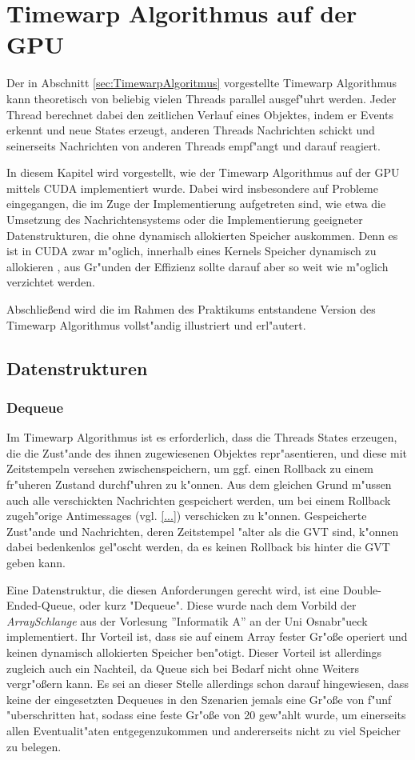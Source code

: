 \documentclass[a4paper, 10pt, openright, parskip, chapterprefix]{scrreprt}
\begin{document}
\chapter{Timewarp Algorithmus auf der GPU}
Der in Abschnitt \ref{sec:TimewarpAlgoritmus} vorgestellte Timewarp Algorithmus kann theoretisch von beliebig vielen Threads
parallel ausgef"uhrt werden. Jeder Thread berechnet dabei den zeitlichen Verlauf eines Objektes, indem er Events erkennt
und neue States erzeugt, anderen Threads Nachrichten schickt und seinerseits Nachrichten von anderen Threads empf"angt
und darauf reagiert. 

In diesem Kapitel wird vorgestellt, wie der Timewarp Algorithmus auf der GPU mittels CUDA implementiert wurde. Dabei wird
insbesondere auf Probleme eingegangen, die im Zuge der Implementierung aufgetreten sind, wie etwa die Umsetzung des
Nachrichtensystems oder die Implementierung geeigneter Datenstrukturen, die ohne dynamisch allokierten Speicher
auskommen. Denn es ist in CUDA zwar m"oglich, innerhalb eines Kernels Speicher dynamisch zu allokieren \cite{...}, aus
Gr"unden der Effizienz sollte darauf aber so weit wie m"oglich verzichtet werden.

Abschlie\ss end wird die im Rahmen des Praktikums entstandene Version des Timewarp Algorithmus vollst"andig illustriert
und erl"autert.

\section{Datenstrukturen}
\subsection{Dequeue}
Im Timewarp Algorithmus ist es erforderlich, dass die Threads States erzeugen, die die Zust"ande des ihnen zugewiesenen
Objektes repr"asentieren, und diese mit Zeitstempeln versehen zwischenspeichern, um ggf. einen Rollback zu einem
fr"uheren Zustand durchf"uhren zu k"onnen. Aus dem gleichen Grund m"ussen auch alle verschickten Nachrichten gespeichert
werden, um bei einem Rollback zugeh"orige Antimessages (vgl. \ref{...}) verschicken zu k"onnen.
Gespeicherte Zust"ande und Nachrichten, deren Zeitstempel "alter als die GVT sind, k"onnen dabei bedenkenlos gel"oscht
werden, da es keinen Rollback bis hinter die GVT geben kann.

Eine Datenstruktur, die diesen Anforderungen gerecht wird, ist eine Double-Ended-Queue, oder kurz "Dequeue". Diese wurde
nach dem Vorbild der \emph{ArraySchlange} aus der Vorlesung ''Informatik A'' \cite{...} an der Uni Osnabr"ueck
implementiert. Ihr Vorteil ist, dass sie auf einem Array fester Gr"o\ss e operiert und keinen dynamisch allokierten
Speicher ben"otigt. Dieser Vorteil ist allerdings zugleich auch ein Nachteil, da Queue sich bei Bedarf nicht ohne
Weiters vergr"o\ss ern kann. Es sei an dieser Stelle allerdings schon darauf hingewiesen, dass keine der eingesetzten
Dequeues in den Szenarien jemals eine Gr"o\ss e von f"unf "uberschritten hat, sodass eine feste Gr"o\ss e von 20
gew"ahlt wurde, um einerseits allen Eventualit"aten entgegenzukommen und andererseits nicht zu viel Speicher zu belegen.
\end{document}
